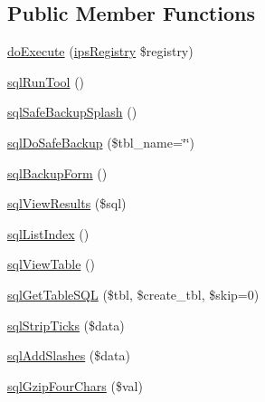 \subsection*{Public Member Functions}
\begin{DoxyCompactItemize}
\item 
\hyperlink{classadmin__core__sql__toolbox__module_afbc4e912a0604b94d47d66744c64d8ba}{do\-Execute} (\hyperlink{classips_registry}{ips\-Registry} \$registry)
\item 
\hyperlink{classadmin__core__sql__toolbox__module_af38ce0f4c40c440b6bc3bb2e454e3633}{sql\-Run\-Tool} ()
\item 
\hyperlink{classadmin__core__sql__toolbox__module_acea61303ec25c96b3ebf8fc1bcbd23af}{sql\-Safe\-Backup\-Splash} ()
\item 
\hyperlink{classadmin__core__sql__toolbox__module_adfcf29765ae67d7ad7337bd7aa048b2e}{sql\-Do\-Safe\-Backup} (\$tbl\-\_\-name=\char`\"{}\char`\"{})
\item 
\hyperlink{classadmin__core__sql__toolbox__module_a0c3298c21532263f1d615c514ed9b332}{sql\-Backup\-Form} ()
\item 
\hyperlink{classadmin__core__sql__toolbox__module_a569a3b70f23b64eb68d02b65a0bb2ea7}{sql\-View\-Results} (\$sql)
\item 
\hyperlink{classadmin__core__sql__toolbox__module_adf67f42a125443d40a35007755f2f4b0}{sql\-List\-Index} ()
\item 
\hyperlink{classadmin__core__sql__toolbox__module_abf314b45bbde896bae49b59f221cf768}{sql\-View\-Table} ()
\item 
\hyperlink{classadmin__core__sql__toolbox__module_a1cf980f75d669faa08419650f93a2cdf}{sql\-Get\-Table\-S\-Q\-L} (\$tbl, \$create\-\_\-tbl, \$skip=0)
\item 
\hyperlink{classadmin__core__sql__toolbox__module_a8cc603393e6843121f16f4d3ce861d31}{sql\-Strip\-Ticks} (\$data)
\item 
\hyperlink{classadmin__core__sql__toolbox__module_ae0a3226fc1cdd3d7484d1a4b784f3a90}{sql\-Add\-Slashes} (\$data)
\item 
\hyperlink{classadmin__core__sql__toolbox__module_aacd4fdb36117a91dc778b619ff1e826a}{sql\-Gzip\-Four\-Chars} (\$val)
\end{DoxyCompactItemize}
